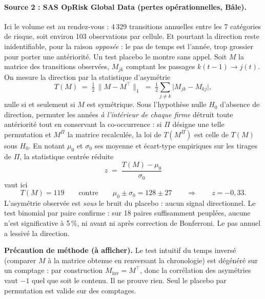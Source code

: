\paragraph{Source 2 : SAS OpRisk Global Data (pertes opérationnelles, Bâle).}
Ici le volume est au rendez-vous : 4\,329 transitions annuelles entre les
7 catégories de risque, soit environ 103 observations par cellule. Et pourtant la
direction reste inidentifiable, pour la raison \emph{opposée} : le pas de temps est
l'année, trop grossier pour porter une antériorité. Un test placebo le montre sans
appel. Soit $M$ la matrice des transitions observées, $M_{jk}$ comptant les passages
$k(t-1)\to j(t)$. On mesure la direction par la statistique d'asymétrie
\begin{equation}
  T(M) \;=\; \tfrac{1}{2}\,\lVert M - M^{\top}\rVert_1
        \;=\; \tfrac{1}{2}\sum_{j\neq k}\bigl|M_{jk}-M_{kj}\bigr| ,
\end{equation}
nulle si et seulement si $M$ est symétrique. Sous l'hypothèse nulle $H_0$ d'absence de
direction, permuter les années \emph{à l'intérieur de chaque firme} détruit toute antériorité
tout en conservant la co-occurrence : si $\Pi$ désigne une telle permutation et $M^{\Pi}$ la
matrice recalculée, la loi de $T(M^{\Pi})$ est celle de $T(M)$ sous $H_0$. En notant $\mu_0$ et
$\sigma_0$ ses moyenne et écart-type empiriques sur les tirages de $\Pi$, la statistique
centrée réduite
\begin{equation}
  z \;=\; \frac{T(M)-\mu_0}{\sigma_0}
\end{equation}
vaut ici
\[
T(M) = 119 \qquad\text{contre}\qquad \mu_0 \pm \sigma_0 = 128 \pm 27
\qquad\Longrightarrow\qquad z = -0{,}33 .
\]
L'asymétrie observée est \emph{sous} le bruit du placebo : aucun signal directionnel. Le
test binomial par paire confirme : sur 18 paires suffisamment peuplées, aucune
n'est significative à 5\,\%, ni avant ni après correction de Bonferroni. Le pas annuel a
lessivé la direction.

\begin{cle}
\textbf{Précaution de méthode (à afficher).} Le test intuitif du \og temps inversé \fg{}
(comparer $M$ à la matrice obtenue en renversant la chronologie) est dégénéré sur
un comptage : par construction $M_{\text{inv}} = M^\top$, donc la corrélation des asymétries
vaut $-1$ quel que soit le contenu. Il ne prouve rien. Seul le placebo par
permutation est valide sur des comptages.
\end{cle}

